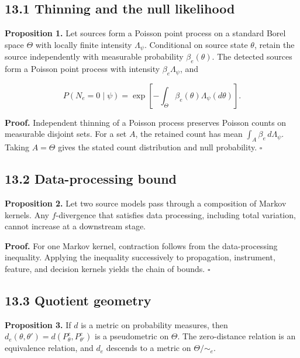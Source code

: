 \documentclass[11pt,a4paper]{article}
\begin{document}
\subsection{13.1 Thinning and the null likelihood}\label{131-thinning-and-the-null-likelihood}

\textbf{Proposition 1.} Let sources form a Poisson point process on a standard Borel space \(\Theta\) with locally finite intensity \(\Lambda_\psi\). Conditional on source state \(\theta\), retain the source independently with measurable probability \(\beta_e(\theta)\). The detected sources form a Poisson point process with intensity \(\beta_e\Lambda_\psi\), and

\begin{equation}
P(N_e=0\mid\psi)=
\exp\!\left[-\int_\Theta\beta_e(\theta)\Lambda_\psi(d\theta)\right].
\end{equation}

\textbf{Proof.} Independent thinning of a Poisson process preserves Poisson counts on measurable disjoint sets. For a set \(A\), the retained count has mean \(\int_A\beta_e\,d\Lambda_\psi\). Taking \(A=\Theta\) gives the stated count distribution and null probability. \(\square\)

\subsection{13.2 Data-processing bound}\label{132-data-processing-bound}

\textbf{Proposition 2.} Let two source models pass through a composition of Markov kernels. Any \(f\)-divergence that satisfies data processing, including total variation, cannot increase at a downstream stage.

\textbf{Proof.} For one Markov kernel, contraction follows from the data-processing inequality. Applying the inequality successively to propagation, instrument, feature, and decision kernels yields the chain of bounds. \(\square\)

\subsection{13.3 Quotient geometry}\label{133-quotient-geometry}

\textbf{Proposition 3.} If \(d\) is a metric on probability measures, then \(d_e(\theta,\theta')=d(P^e_\theta,P^e_{\theta'})\) is a pseudometric on \(\Theta\). The zero-distance relation is an equivalence relation, and \(d_e\) descends to a metric on \(\Theta/{\sim_e}\).
\end{document}
